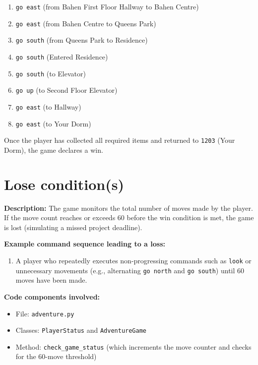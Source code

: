 \documentclass[11pt]{article}
\begin{document}
\begin{enumerate}
    \item \texttt{go east} \quad (from Bahen First Floor Hallway to Bahen Centre)
    \item \texttt{go east} \quad (from Bahen Centre to Queens Park)
    \item \texttt{go south} \quad (from Queens Park to Residence)
    \item \texttt{go south} \quad (Entered Residence)
    \item \texttt{go south} \quad (to Elevator)
    \item \texttt{go up} \quad (to Second Floor Elevator)
    \item \texttt{go east} \quad (to Hallway)
    \item \texttt{go east} \quad (to Your Dorm) \quad 
\end{enumerate}


Once the player has collected all required items and returned to \texttt{1203} (Your Dorm), the game declares a win.

\section*{Lose condition(s)}
\textbf{Description:} The game monitors the total number of moves made by the player. If the move count reaches or exceeds 60 before the win condition is met, the game is lost (simulating a missed project deadline).

\medskip
\textbf{Example command sequence leading to a loss:}
\begin{enumerate}
    \item A player who repeatedly executes non-progressing commands such as \texttt{look} or unnecessary movements (e.g., alternating \texttt{go north} and \texttt{go south}) until 60 moves have been made.
\end{enumerate}

\medskip
\textbf{Code components involved:}
\begin{itemize}
    \item File: \texttt{adventure.py}
    \item Classes: \texttt{PlayerStatus} and \texttt{AdventureGame}
    \item Method: \texttt{check\_game\_status} (which increments the move counter and checks for the 60-move threshold)
\end{itemize}
\end{document}
